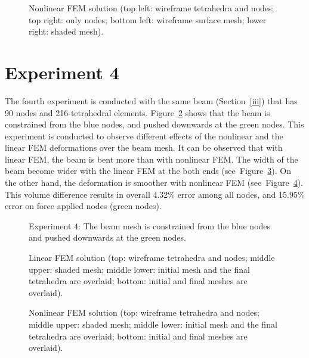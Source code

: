 \begin{figure}[c]
\centerline{}
\caption{Nonlinear FEM solution (top left: wireframe tetrahedra and nodes; top right: only nodes; bottom left: wireframe surface mesh; lower right: shaded mesh).}
\label{fig:fig10}
\end{figure}

\clearpage

\section{Experiment 4}
\label{iv}

The fourth experiment is conducted with the same beam (Section~\ref{iii}) that has 90 nodes and 216-tetrahedral elements. Figure~\ref{fig:fig11} shows that the beam is constrained from the blue nodes, and pushed downwards at the green nodes. This experiment is conducted to observe different effects of the nonlinear and the linear FEM deformations over the beam mesh. It can be observed that with linear FEM, the beam is bent more than with nonlinear FEM. The width of the beam become wider with the linear FEM at the both ends (see~Figure~\ref{fig:fig12}). On the other hand, the deformation is smoother with nonlinear FEM (see~Figure~\ref{fig:fig13}). This volume difference results in overall 4.32\% error among all nodes, and 15.95\% error on force applied nodes (green nodes).

\begin{figure}[h]
\centerline{}
\caption{Experiment 4: The beam mesh is constrained from the blue nodes and pushed downwards at the green nodes.}
\label{fig:fig11}
\end{figure}

\begin{figure}[c]
\centerline{}
\caption{Linear FEM solution (top: wireframe tetrahedra and nodes; middle upper: shaded mesh; middle lower: initial mesh and the final tetrahedra are overlaid; bottom: initial and final meshes are overlaid).}
\label{fig:fig12}
\end{figure}

\begin{figure}[c]
\centerline{}
\caption{Nonlinear FEM solution (top: wireframe tetrahedra and nodes; middle upper: shaded mesh; middle lower: initial mesh and the final tetrahedra are overlaid; bottom: initial and final meshes are overlaid).}
\label{fig:fig13}
\end{figure}

